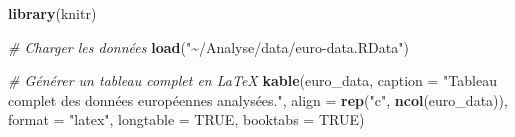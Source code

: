\documentclass[
]{article}
\newenvironment{Shaded}{\begin{snugshade}}{\end{snugshade}}
\newcommand{\AttributeTok}[1]{\textcolor[rgb]{0.13,0.29,0.53}{#1}}
\newcommand{\CommentTok}[1]{\textcolor[rgb]{0.56,0.35,0.01}{\textit{#1}}}
\newcommand{\ConstantTok}[1]{\textcolor[rgb]{0.56,0.35,0.01}{#1}}
\newcommand{\FunctionTok}[1]{\textcolor[rgb]{0.13,0.29,0.53}{\textbf{#1}}}
\newcommand{\NormalTok}[1]{#1}
\newcommand{\StringTok}[1]{\textcolor[rgb]{0.31,0.60,0.02}{#1}}
\begin{document}
\begin{Shaded}
\begin{Highlighting}[]
\FunctionTok{library}\NormalTok{(knitr)}

\CommentTok{\# Charger les données}
\FunctionTok{load}\NormalTok{(}\StringTok{"\textasciitilde{}/Analyse/data/euro{-}data.RData"}\NormalTok{)}

\CommentTok{\# Générer un tableau complet en LaTeX}
\FunctionTok{kable}\NormalTok{(euro\_data, }
      \AttributeTok{caption =} \StringTok{"Tableau complet des données européennes analysées."}\NormalTok{, }
      \AttributeTok{align =} \FunctionTok{rep}\NormalTok{(}\StringTok{"c"}\NormalTok{, }\FunctionTok{ncol}\NormalTok{(euro\_data)), }
      \AttributeTok{format =} \StringTok{"latex"}\NormalTok{, }
      \AttributeTok{longtable =} \ConstantTok{TRUE}\NormalTok{, }
      \AttributeTok{booktabs =} \ConstantTok{TRUE}\NormalTok{)}
\end{Highlighting}
\end{Shaded}
\end{document}
